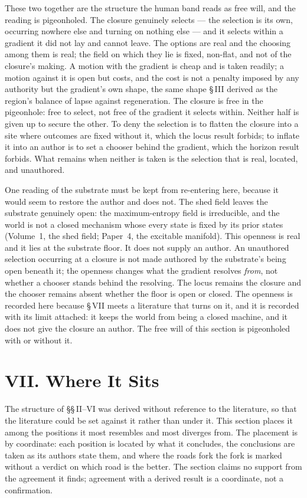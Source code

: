 \documentclass[11pt,oneside]{report}
\theoremstyle{definition}
\theoremstyle{remark}
\begin{document}
These two together are the structure the human band reads as free will, and the reading is pigeonholed. The closure genuinely selects --- the selection is its own, occurring nowhere else and turning on nothing else --- and it selects within a gradient it did not lay and cannot leave. The options are real and the choosing among them is real; the field on which they lie is fixed, non-flat, and not of the closure's making. A motion with the gradient is cheap and is taken readily; a motion against it is open but costs, and the cost is not a penalty imposed by any authority but the gradient's own shape, the same shape \S\,III derived as the region's balance of lapse against regeneration. The closure is free in the pigeonhole: free to select, not free of the gradient it selects within. Neither half is given up to secure the other. To deny the selection is to flatten the closure into a site where outcomes are fixed without it, which the locus result forbids; to inflate it into an author is to set a chooser behind the gradient, which the horizon result forbids. What remains when neither is taken is the selection that is real, located, and unauthored.

One reading of the substrate must be kept from re-entering here, because it would seem to restore the author and does not. The shed field leaves the substrate genuinely open: the maximum-entropy field is irreducible, and the world is not a closed mechanism whose every state is fixed by its prior states (Volume~1, the shed field; Paper~4, the excitable manifold). This openness is real and it lies at the substrate floor. It does not supply an author. An unauthored selection occurring at a closure is not made authored by the substrate's being open beneath it; the openness changes what the gradient resolves \emph{from}, not whether a chooser stands behind the resolving. The locus remains the closure and the chooser remains absent whether the floor is open or closed. The openness is recorded here because \S\,VII meets a literature that turns on it, and it is recorded with its limit attached: it keeps the world from being a closed machine, and it does not give the closure an author. The free will of this section is pigeonholed with or without it.

\section*{VII. Where It Sits}

The structure of \S\S\,II--VI was derived without reference to the literature, so that the literature could be set against it rather than under it. This section places it among the positions it most resembles and most diverges from. The placement is by coordinate: each position is located by what it concludes, the conclusions are taken as its authors state them, and where the roads fork the fork is marked without a verdict on which road is the better. The section claims no support from the agreement it finds; agreement with a derived result is a coordinate, not a confirmation.
\end{document}
